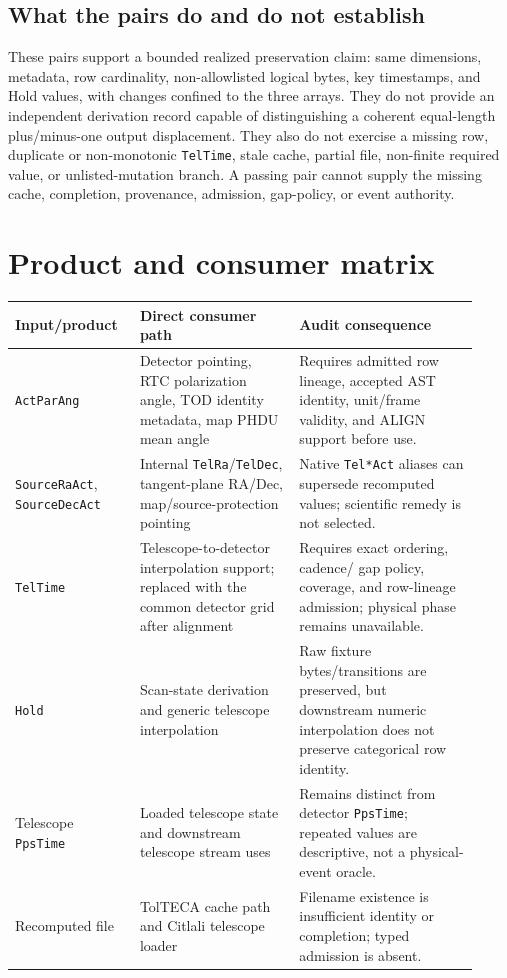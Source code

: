 \documentclass[11pt]{article}
\newcommand{\code}[1]{\texttt{#1}}
\begin{document}
\subsection{What the pairs do and do not establish}

These pairs support a bounded realized preservation claim: same dimensions,
metadata, row cardinality, non-allowlisted logical bytes, key timestamps, and
Hold values, with changes confined to the three arrays.  They do not provide
an independent derivation record capable of distinguishing a coherent
equal-length plus/minus-one output displacement.  They also do not exercise a
missing row, duplicate or non-monotonic \code{TelTime}, stale cache, partial
file, non-finite required value, or unlisted-mutation branch.  A passing pair
cannot supply the missing cache, completion, provenance, admission, gap-policy,
or event authority.

\section{Product and consumer matrix}

\begin{longtable}{@{}L{0.24\linewidth}L{0.32\linewidth}L{0.36\linewidth}@{}}
\toprule
Input/product & Direct consumer path & Audit consequence \\
\midrule
\endhead
\code{ActParAng} & Detector pointing, RTC polarization angle, TOD identity
metadata, map PHDU mean angle & Requires admitted row lineage, accepted AST
identity, unit/frame validity, and ALIGN support before use. \\
\code{SourceRaAct}, \code{SourceDecAct} & Internal \code{TelRa}/\code{TelDec},
tangent-plane RA/Dec, map/source-protection pointing & Native \code{Tel*Act}
aliases can supersede recomputed values; scientific remedy is not selected. \\
\code{TelTime} & Telescope-to-detector interpolation support; replaced with
the common detector grid after alignment & Requires exact ordering, cadence/
gap policy, coverage, and row-lineage admission; physical phase remains
unavailable. \\
\code{Hold} & Scan-state derivation and generic telescope interpolation & Raw
fixture bytes/transitions are preserved, but downstream numeric interpolation
does not preserve categorical row identity. \\
Telescope \code{PpsTime} & Loaded telescope state and downstream telescope
stream uses & Remains distinct from detector \code{PpsTime}; repeated values
are descriptive, not a physical-event oracle. \\
Recomputed file & TolTECA cache path and Citlali telescope loader & Filename
existence is insufficient identity or completion; typed admission is absent. \\
\bottomrule
\end{longtable}
\end{document}
